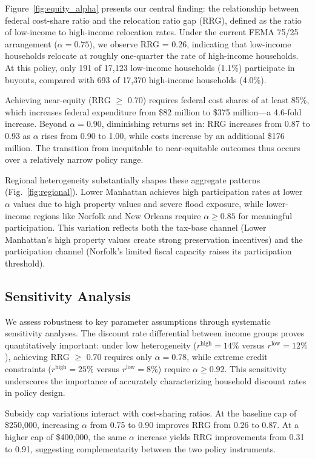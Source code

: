 \documentclass[11pt,letterpaper]{article}
\theoremstyle{definition}
\begin{document}
Figure~\ref{fig:equity_alpha} presents our central finding: the relationship between federal cost-share ratio and the relocation ratio gap (RRG), defined as the ratio of low-income to high-income relocation rates. Under the current FEMA 75/25 arrangement ($\alpha = 0.75$), we observe RRG = 0.26, indicating that low-income households relocate at roughly one-quarter the rate of high-income households. At this policy, only 191 of 17,123 low-income households (1.1\%) participate in buyouts, compared with 693 of 17,370 high-income households (4.0\%).

Achieving near-equity (RRG $\geq$ 0.70) requires federal cost shares of at least 85\%, which increases federal expenditure from \$82 million to \$375 million---a 4.6-fold increase. Beyond $\alpha = 0.90$, diminishing returns set in: RRG increases from 0.87 to 0.93 as $\alpha$ rises from 0.90 to 1.00, while costs increase by an additional \$176 million. The transition from inequitable to near-equitable outcomes thus occurs over a relatively narrow policy range.

Regional heterogeneity substantially shapes these aggregate patterns (Fig.~\ref{fig:regional}). Lower Manhattan achieves high participation rates at lower $\alpha$ values due to high property values and severe flood exposure, while lower-income regions like Norfolk and New Orleans require $\alpha \geq 0.85$ for meaningful participation. This variation reflects both the tax-base channel (Lower Manhattan's high property values create strong preservation incentives) and the participation channel (Norfolk's limited fiscal capacity raises its participation threshold).

\subsection{Sensitivity Analysis}

We assess robustness to key parameter assumptions through systematic sensitivity analyses. The discount rate differential between income groups proves quantitatively important: under low heterogeneity ($r^{\text{high}} = 14\%$ versus $r^{\text{low}} = 12\%$), achieving RRG $\geq$ 0.70 requires only $\alpha = 0.78$, while extreme credit constraints ($r^{\text{high}} = 25\%$ versus $r^{\text{low}} = 8\%$) require $\alpha \geq 0.92$. This sensitivity underscores the importance of accurately characterizing household discount rates in policy design.

Subsidy cap variations interact with cost-sharing ratios. At the baseline cap of \$250,000, increasing $\alpha$ from 0.75 to 0.90 improves RRG from 0.26 to 0.87. At a higher cap of \$400,000, the same $\alpha$ increase yields RRG improvements from 0.31 to 0.91, suggesting complementarity between the two policy instruments.
\end{document}
